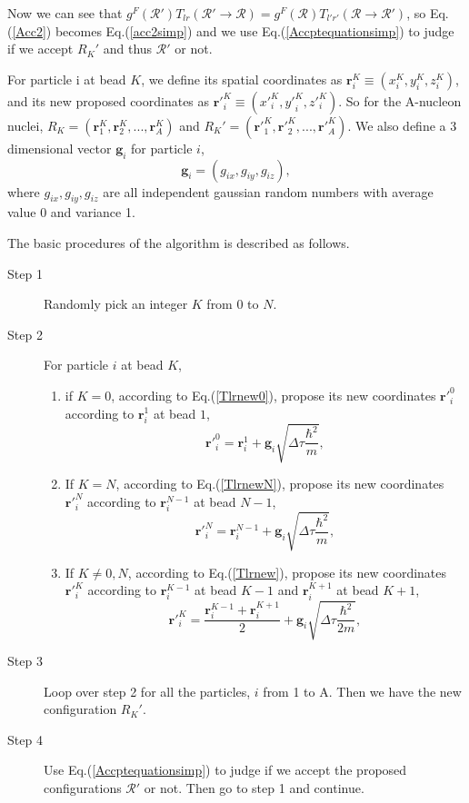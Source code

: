 \documentclass[12pt,letterpaper,UTF8]{report}
\begin{document}
Now we can see that $g^F(\mathcal{R}')  T_{lr}(\mathcal{R}' \! \rightarrow \! \mathcal{R}) = g^F(\mathcal{R}) T_{l'r'}(\mathcal{R} \! \rightarrow \! \mathcal{R}') $, so Eq.(\ref{Acc2}) becomes Eq.(\ref{acc2simp}) and we use Eq.(\ref{Accptequationsimp}) to judge if we accept $R_K'$ and thus $\mathcal{R}'$ or not.

For particle i at bead $K$, we define its spatial coordinates as $\bm{r}^K_i \equiv (x^K_i,y^K_i,z^K_i)$, and its new proposed coordinates as $ \bm{r'}^K_i \equiv ({x'}^K_i,{y'}^K_i,{z'}^K_i)$. So for the A-nucleon nuclei, $R_K=(\bm{r}^K_1, \bm{r}^K_2, ..., \bm{r}^K_A)$ and $R_K'=(\bm{r'}^K_1, \bm{r'}^K_2, ..., \bm{r'}^K_A)$. We also define a 3 dimensional vector $\bm{g}_i$ for particle $i$,
\begin{equation}
\bm{g}_i=(g_{ix},g_{iy},g_{iz}), \label{gaussgi}
\end{equation}
where $g_{ix},g_{iy},g_{iz}$ are all independent gaussian random numbers with average value 0 and variance 1.

The basic procedures of the algorithm is described as follows.
\begin{description}
  \item[Step 1] Randomly pick an integer $K$ from 0 to $N$.
  \item[Step 2] For particle $i$ at bead $K$,
  \begin{enumerate}
    \item if $K=0$, according to Eq.(\ref{Tlrnew0}), propose its new coordinates ${\bm{r}'}^0_i$ according to ${\bm{r}}^{1}_i$ at bead $1$,
\begin{equation}
{\bm{r}'}^0_i = \bm{r}^{1}_i + \bm{g}_i \sqrt{  \Delta \tau  \frac{\hbar^2}{m} } ,
\end{equation}
    \item If $K=N$, according to Eq.(\ref{TlrnewN}), propose its new coordinates ${\bm{r}'}^N_i$ according to ${\bm{r}}^{N-1}_i$ at bead $N-1$,
\begin{equation}
{\bm{r}'}^N_i = \bm{r}^{N-1}_i + \bm{g}_i \sqrt{  \Delta \tau  \frac{\hbar^2}{m} } ,
\end{equation}
    \item
If $K\neq 0,N$, according to Eq.(\ref{Tlrnew}), propose its new coordinates ${\bm{r}'}^K_i$ according to ${\bm{r}}^{K-1}_i$ at bead $K-1$ and ${\bm{r}}^{K+1}_i$ at bead $K+1$,
\begin{equation}
{\bm{r}'}^K_i = \frac{\bm{r}^{K-1}_i+\bm{r}^{K+1}_i}{2} + \bm{g}_i \sqrt{ \Delta \tau  \frac{\hbar^2}{2 m} } ,
\end{equation}
  \end{enumerate}
  \item[Step 3] Loop over step 2 for all the particles, $i$ from 1 to A. Then we have the new configuration $R_K'$.
  \item[Step 4] Use Eq.(\ref{Accptequationsimp}) to judge if we accept the proposed configurations $\mathcal{R}'$ or not. Then go to step 1 and continue.
\end{description}
\end{document}
